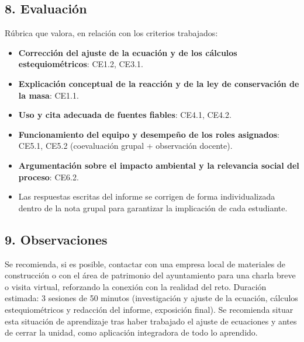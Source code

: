 \documentclass[11pt,a4paper]{article}
\begin{document}
\subsection*{8. Evaluación}
Rúbrica que valora, en relación con los criterios trabajados:
\begin{itemize}
    \item \textbf{Corrección del ajuste de la ecuación y de los cálculos estequiométricos}: CE1.2, CE3.1.
    \item \textbf{Explicación conceptual de la reacción y de la ley de conservación de la masa}: CE1.1.
    \item \textbf{Uso y cita adecuada de fuentes fiables}: CE4.1, CE4.2.
    \item \textbf{Funcionamiento del equipo y desempeño de los roles asignados}: CE5.1, CE5.2 (coevaluación grupal + observación docente).
    \item \textbf{Argumentación sobre el impacto ambiental y la relevancia social del proceso}: CE6.2.
    \item Las respuestas escritas del informe se corrigen de forma individualizada dentro de la nota grupal para garantizar la implicación de cada estudiante.
\end{itemize}

\subsection*{9. Observaciones}
Se recomienda, si es posible, contactar con una empresa local de materiales de construcción o con el área de patrimonio del ayuntamiento para una charla breve o visita virtual, reforzando la conexión con la realidad del reto. Duración estimada: 3 sesiones de 50 minutos (investigación y ajuste de la ecuación, cálculos estequiométricos y redacción del informe, exposición final). Se recomienda situar esta situación de aprendizaje tras haber trabajado el ajuste de ecuaciones y antes de cerrar la unidad, como aplicación integradora de todo lo aprendido.
\end{document}
